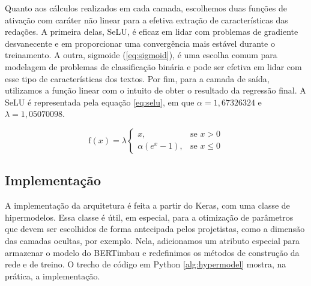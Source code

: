 Quanto aos cálculos realizados em cada camada, escolhemos duas funções de ativação com caráter não linear para a efetiva extração de características das redações. A primeira delas, SeLU, é eficaz em lidar com problemas de gradiente desvanecente e em proporcionar uma convergência mais estável durante o treinamento. A outra, sigmoide (\ref{eq:sigmoid}), é uma escolha comum para modelagem de problemas de classificação binária e pode ser efetiva em lidar com esse tipo de características dos textos. Por fim, para a camada de saída, utilizamos a função linear com o intuito de obter o resultado da regressão final. A SeLU é representada pela equação \ref{eq:selu}, em que $\alpha = 1,67326324$ e $\lambda = 1,05070098$.

\begin{equation}
    \label{eq:selu}
    \text{f}(x) = \lambda
    \begin{cases}
        x, & \text{se } x > 0 \\
        \alpha (e^{x} - 1), & \text{se } x \leq 0
    \end{cases}
\end{equation}

\subsection{Implementação}
\label{subsec:implementation}

A implementação da arquitetura é feita a partir do Keras, com uma classe de hipermodelos. Essa classe é útil, em especial, para a otimização de parâmetros que devem ser escolhidos de forma antecipada pelos projetistas, como a dimensão das camadas ocultas, por exemplo. Nela, adicionamos um atributo especial para armazenar o modelo do BERTimbau e redefinimos os métodos de construção da rede e de treino. O trecho de código em Python \ref{alg:hypermodel} mostra, na prática, a implementação.


